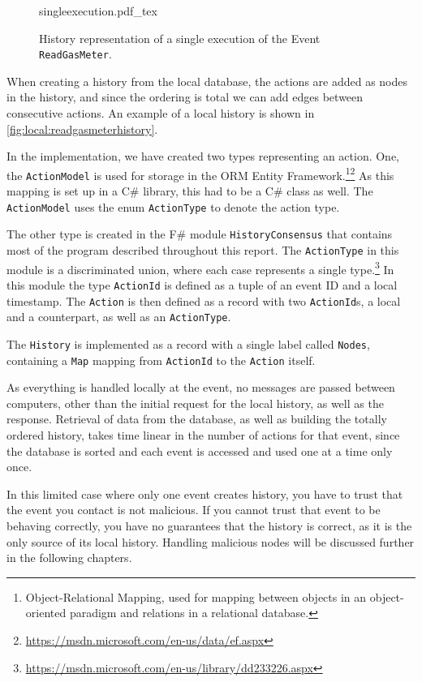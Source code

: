 	\begin{figure}
		\centering
		{singleexecution.pdf_tex}
		\caption{History representation of a single execution of the Event \texttt{ReadGasMeter}.}
		\label{fig:local:readgasmeterhistory}
	\end{figure}
	\newpar When creating a history from the local database, the actions are added as nodes in the history, and since the ordering is total we can add edges between consecutive actions. An example of a local history is shown in \autoref{fig:local:readgasmeterhistory}.
	
	\newpar In the implementation, we have created two types representing an action. One, the \texttt{ActionModel} is used for storage in the ORM Entity Framework.\footnote{Object-Relational Mapping, used for mapping between objects in an object-oriented paradigm and relations in a relational database.}\footnote{\url{https://msdn.microsoft.com/en-us/data/ef.aspx}} As this mapping is set up in a C\# library, this had to be a C\# class as well. The \texttt{ActionModel} uses the enum \texttt{ActionType} to denote the action type.
	
	The other type is created in the F\# module \texttt{HistoryConsensus} that contains most of the program described throughout this report. The \texttt{ActionType} in this module is a discriminated union, where each case represents a single type.\footnote{\url{https://msdn.microsoft.com/en-us/library/dd233226.aspx}}
	In this module the type \texttt{ActionId} is defined as a tuple of an event ID and a local timestamp. The \texttt{Action} is then defined as a record  with two \texttt{ActionId}s, a local and a counterpart, as well as an \texttt{ActionType}.
	
	The \texttt{History} is implemented as a record with a single label called \texttt{Nodes}, containing a \texttt{Map} mapping from \texttt{ActionId} to the \texttt{Action} itself.
	
	\newpar As everything is handled locally at the event, no messages are passed between computers, other than the initial request for the local history, as well as the response. Retrieval of data from the database, as well as building the totally ordered history, takes time linear in the number of actions for that event, since the database is sorted and each event is accessed and used one at a time only once.
	
	\newpar In this limited case where only one event creates history, you have to trust that the event you contact is not malicious. If you cannot trust that event to be behaving correctly, you have no guarantees that the history is correct, as it is the only source of its local history. Handling malicious nodes will be discussed further in the following chapters.
